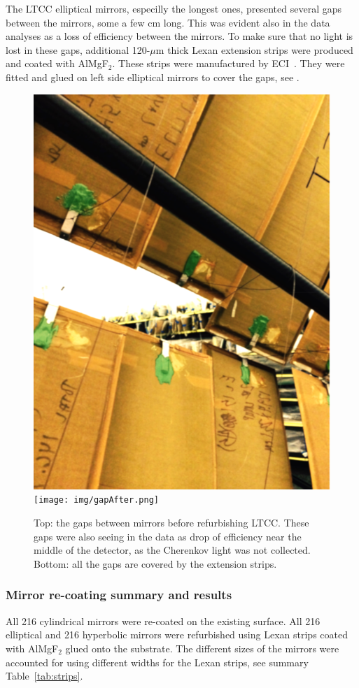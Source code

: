 The LTCC elliptical mirrors, especilly the longest ones, presented several gaps between the mirrors, some a few cm long.
This was evident also in the data analyses as a loss of efficiency between the mirrors.
To make sure that no light is lost in these gaps, additional 120-$\mu$m thick Lexan extension strips were produced and coated with AlMgF$_2$.
These strips were manufactured by ECI~\cite{ECI}. They were fitted and glued on left side elliptical mirrors to cover the gaps,
see .

\begin{figure}
\centering
	\includegraphics[width=0.98\columnwidth, height=0.7\columnwidth]{img/gapBefore.png}
	\texttt{[image: img/gapAfter.png]}
	\caption{Top: the gaps between mirrors before refurbishing LTCC. These gaps were also seeing in the data as
			 drop of efficiency near the middle of the detector, as the Cherenkov light was not collected.
             Bottom: all the gaps are covered by the extension strips.}
	\label{fig:gapBeforeAndAfter}
\end{figure}


\subsubsection{Mirror re-coating summary and results}

All 216 cylindrical mirrors were re-coated on the existing surface. All 216 elliptical and 216 hyperbolic mirrors were refurbished using Lexan strips
coated with AlMgF$_2$ glued onto the substrate. The different sizes of the mirrors were accounted for using different widths for the Lexan strips, see
summary Table~\ref{tab:strips}.


